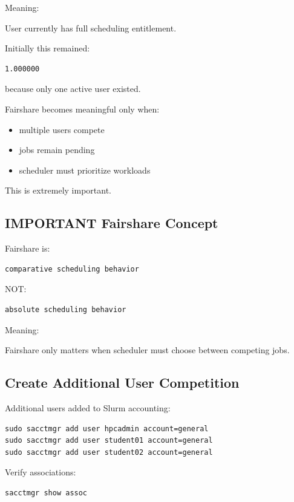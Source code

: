 \documentclass[11pt]{article}
\begin{document}
Meaning:

User currently has full scheduling entitlement.

Initially this remained:

\begin{verbatim}
1.000000
\end{verbatim}

because only one active user existed.

Fairshare becomes meaningful only when:

\begin{itemize}
\item multiple users compete
\item jobs remain pending
\item scheduler must prioritize workloads
\end{itemize}

This is extremely important.
\subsection{IMPORTANT Fairshare Concept}
\label{sec:org8e0e1f6}

Fairshare is:

\begin{verbatim}
comparative scheduling behavior
\end{verbatim}

NOT:

\begin{verbatim}
absolute scheduling behavior
\end{verbatim}

Meaning:

Fairshare only matters when scheduler must choose between competing jobs.
\subsection{Create Additional User Competition}
\label{sec:org3e36889}

Additional users added to Slurm accounting:

\begin{verbatim}
sudo sacctmgr add user hpcadmin account=general
sudo sacctmgr add user student01 account=general
sudo sacctmgr add user student02 account=general
\end{verbatim}

Verify associations:

\begin{verbatim}
sacctmgr show assoc
\end{verbatim}
\end{document}
